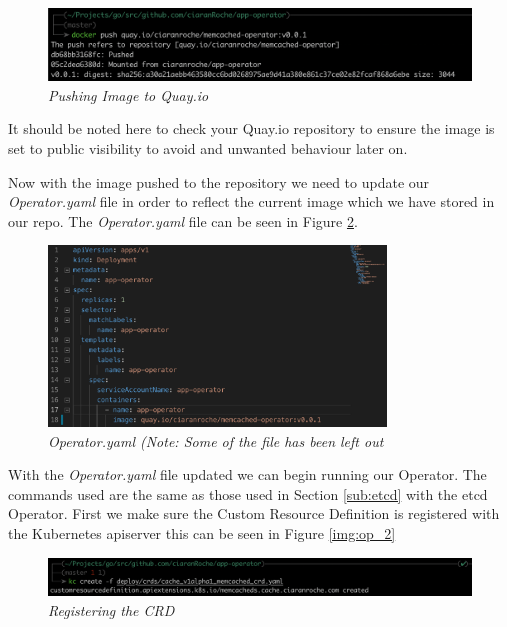 \begin{figure}[!ht]
\centering
\includegraphics*[width=1\textwidth]{images/p14.png}
\caption{\em Pushing Image to Quay.io}
\label{img:p14}
\end{figure}
It should be noted here to check your Quay.io repository to ensure the image is set to public visibility to avoid and unwanted behaviour later on.

Now with the image pushed to the repository we need to update our \textit{Operator.yaml} file in order to reflect the current image which we have stored in our repo. The \textit{Operator.yaml} file can be seen in Figure \ref{img:opp01}.

\begin{figure}[!ht]
\centering
\includegraphics*[width=0.8\textwidth]{images/opp01.png}
\caption{\em Operator.yaml (Note: Some of the file has been left out}
\label{img:opp01}
\end{figure}

With the \textit{Operator.yaml} file updated we can begin running our Operator. The commands used are the same as those used in Section \ref{sub:etcd} with the etcd Operator. 
First we make sure the Custom Resource Definition is registered with the Kubernetes apiserver this can be seen in Figure \ref{img:op_2}
\begin{figure}[!ht]
\centering
\includegraphics*[width=1\textwidth]{images/op02.png}
\caption{\em Registering the CRD}
\label{img:op02}
\end{figure}

